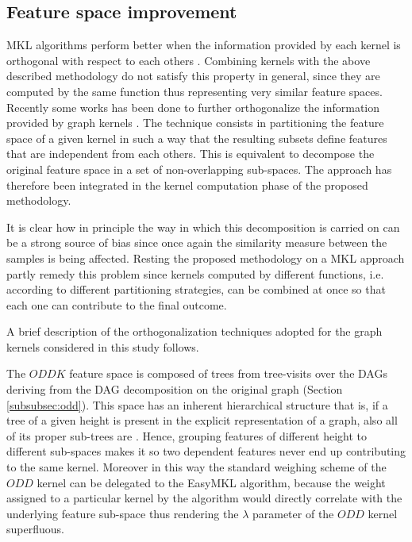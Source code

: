 
\subsection{Feature space improvement}
\label{subsec:features}

MKL algorithms perform better when the information provided by each kernel is
orthogonal with respect to each others \cite{gmkl}.
Combining kernels with the above described methodology do not satisfy this property
in general, since they are computed by the same function thus representing very similar feature
spaces.
Recently some works has been done to further orthogonalize the information
provided by graph kernels \cite{gmkl}.
The technique consists in partitioning the feature space of a given kernel in such
a way that the resulting subsets define features that are independent from each others.
This is equivalent to decompose the original feature space in a set of non-overlapping
sub-spaces.
The approach has therefore been integrated in the kernel computation phase of
the proposed methodology.

It is clear how in principle the way in which this decomposition is carried on can be a
strong source of bias since once again the similarity measure between the samples
is being affected.
Resting the proposed methodology on a MKL approach partly remedy this problem since
kernels computed by different functions, i.e. according to different partitioning
strategies, can be combined at once so that each one can contribute to the final
outcome.

A brief description of the orthogonalization techniques adopted for the graph
kernels considered in this study follows.

The $ODDK$ feature space is composed of trees from tree-visits over the DAGs
deriving from the DAG decomposition on the original graph (Section \ref{subsubsec:odd}).
This space has an inherent hierarchical structure that is, if a tree of a given
height is present in the explicit representation of a graph, also all of its proper
sub-trees are \cite{gmkl}.
Hence, grouping features of different height to different sub-spaces makes it so
two dependent features never end up contributing to the same kernel.
Moreover in this way the standard weighing scheme of the $ODD$ kernel can be
delegated to the EasyMKL algorithm, because the weight assigned to a particular
kernel by the algorithm would directly correlate with the underlying feature
sub-space thus rendering the $\lambda$ parameter of the $ODD$ kernel superfluous.

